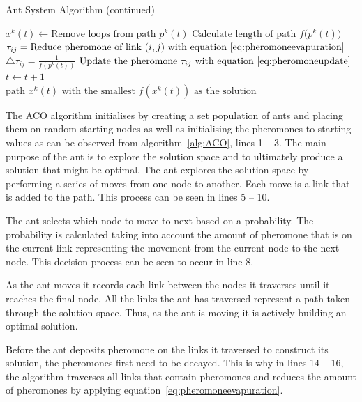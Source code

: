 \begin{algorithm}[H]
\caption{Ant System Algorithm (continued)}
\label{alg:ACO1}
	\begin{algorithmic}
			\State$x^k(t) \leftarrow \text{Remove loops from path }p^k(t)$
			\State$\text{Calculate length of path $f(p^k(t)$})$
		\EndFor
			\State$\tau_{ij} = \text{Reduce pheromone of link $(i,j)$ with equation~\ref{eq:pheromoneevapuration}}$
		\EndFor
				\State$\triangle \tau_{ij} = \frac{1}{f(p^k(t))}$
				\State$\text{Update the pheromone $\tau_{ij}$ with equation~\ref{eq:pheromoneupdate}}$
			\EndFor
		\EndFor
		\State$t \leftarrow t + 1$
	\EndWhile\\
	\Return $\text{path $x^k(t)$ with the smallest $f(x^k(t))$ as the solution}$
	\end{algorithmic}
\end{algorithm}

The ACO algorithm initialises by creating a set population of ants and placing them on random starting nodes as well as initialising the pheromones to starting values as can be observed from algorithm~\ref{alg:ACO}, lines 1 -- 3. The main purpose of the ant is to explore the solution space and to ultimately produce a solution that might be optimal. The ant explores the solution space by performing a series of moves from one node to another. Each move is a link that is added to the path. This process can be seen in lines 5 -- 10.

The ant selects which node to move to next based on a probability. The probability is calculated taking into account the amount of pheromone that is on the current link representing the movement from the current node to the next node\cite{CompuIntelligenceIntro,FundamentalSwarm}. This decision process can be seen to occur in line 8.

As the ant moves it records each link between the nodes it traverses until it reaches the final node. All the links the ant has traversed represent a path taken through the solution space\cite{CompuIntelligenceIntro,FundamentalSwarm}. Thus, as the ant is moving it is actively building an optimal solution.

Before the ant deposits pheromone on the links it traversed to construct its solution, the pheromones first need to be decayed. This is why in lines 14 -- 16, the algorithm traverses all links that contain pheromones and reduces the amount of pheromones by applying equation~\ref{eq:pheromoneevapuration}.

